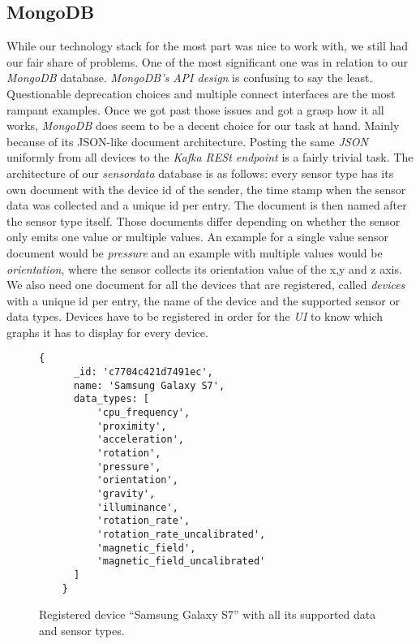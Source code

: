 \subsection{MongoDB}

While our technology stack for the most part was nice to work with, we still had our fair share of
problems. One of the most significant one was in relation to our \textit{MongoDB} database.
\textit{MongoDB’s API design} is confusing to say the least. Questionable deprecation choices and
multiple connect interfaces are the most rampant examples. Once we got past those issues and got a
grasp how it all works, \textit{MongoDB} does seem to be a decent choice for our task at hand.
Mainly because of its JSON-like document architecture. Posting the same \textit{JSON} uniformly from
all devices to the \textit{Kafka RESt endpoint} is a fairly trivial task. The architecture of our
\textit{sensordata} database is as follows: every sensor type has its own document with the device
id of the sender, the time stamp when the sensor data was collected and a unique id per entry. The
document is then named after the sensor type itself. Those documents differ depending on whether the
sensor only emits one value or multiple values. An example for a single value sensor document would
be \textit{pressure} and an example with multiple values would be \textit{orientation}, where the
sensor collects its orientation value of the x,y and z axis. We also need one document for all the
devices that are registered, called \textit{devices} with a unique id per entry, the name of the
device and the supported sensor or data types. Devices have to be registered in order for the
\textit{UI} to know which graphs it has to display for every device.

\begin{figure}[H]
  \centering
  \begin{lstlisting}[basicstyle=\small\ttfamily]
    {
      _id: 'c7704c421d7491ec',
      name: 'Samsung Galaxy S7',
      data_types: [
          'cpu_frequency',
          'proximity',
          'acceleration',
          'rotation',
          'pressure',
          'orientation',
          'gravity',
          'illuminance',
          'rotation_rate',
          'rotation_rate_uncalibrated',
          'magnetic_field',
          'magnetic_field_uncalibrated'
      ]
    }
  \end{lstlisting}
  \caption{Registered device “Samsung Galaxy S7” with all its supported data and sensor types.}
\end{figure}
